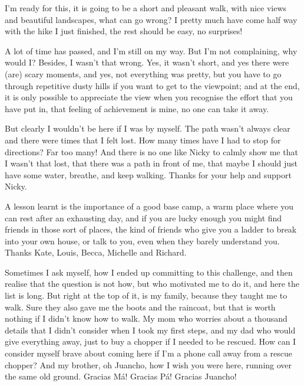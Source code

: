 

\vspace{3mm}

I'm ready for this, it is going to be a short and pleasant walk, with nice views and beautiful landscapes, what can go wrong? I pretty much have come half way with the hike I just finished, the rest should be easy, no surprises!

A lot of time has passed, and I'm still on my way. But I'm not complaining, why would I? Besides, I wasn't that wrong. Yes, it wasn't short, and yes there were (are) scary moments, and yes, not everything was pretty, but you have to go through repetitive dusty hills if you want to get to the viewpoint; and at the end, it is only possible to appreciate the view when you recognise the effort that you have put in, that feeling of achievement is mine, no one can take it away. 

But clearly I wouldn't be here if I was by myself. The path wasn't always clear and there were times that I felt lost. How many times have I had to stop for directions? Far too many! And there is no one like Nicky to calmly show me that I wasn't that lost, that there was a path in front of me, that maybe I should just have some water, breathe, and keep walking. Thanks for your help and support Nicky.

A lesson learnt is the importance of a good base camp, a warm place where you can rest after an exhausting day, and if you are lucky enough you might find friends in those sort of places, the kind of friends who give you a ladder to break into your own house, or talk to you, even when they barely understand you. Thanks Kate, Louis, Becca, Michelle and Richard.

\vspace{3mm}

Sometimes I ask myself, how I ended up committing to this challenge, and then realise that the question is not how, but who motivated me to do it, and here the list is long. But right at the top of it, is my family, because they taught me to walk. Sure they also gave me the boots and the raincoat, but that is worth nothing if I didn't know how to walk. My mom who worries about a thousand details that I didn't consider when I took my first steps, and my dad who would give everything away, just to buy a chopper if I needed to be rescued. How can I consider myself brave about coming here if I'm a phone call away from a rescue chopper? And my brother, oh Juancho, how I wish you were here, running over the same old ground. Gracias M\'a! Gracias P\'a! Gracias Juancho!

